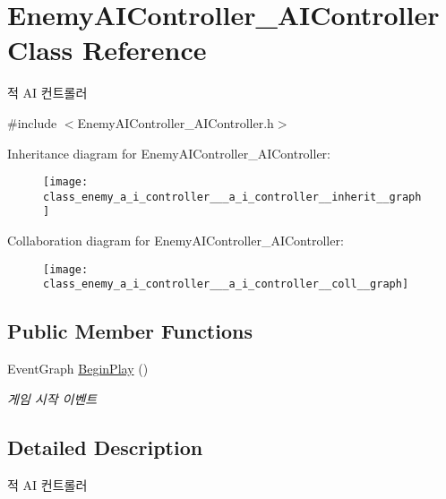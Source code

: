 \hypertarget{class_enemy_a_i_controller___a_i_controller}{}\section{Enemy\+A\+I\+Controller\+\_\+\+A\+I\+Controller Class Reference}
\label{class_enemy_a_i_controller___a_i_controller}


적 AI 컨트롤러  




{\ttfamily \#include $<$Enemy\+A\+I\+Controller\+\_\+\+A\+I\+Controller.\+h$>$}



Inheritance diagram for Enemy\+A\+I\+Controller\+\_\+\+A\+I\+Controller\+:
\nopagebreak
\begin{figure}[H]
\begin{center}
\leavevmode
\texttt{[image: class\_enemy\_a\_i\_controller\_\_\_a\_i\_controller\_\_inherit\_\_graph]}
\end{center}
\end{figure}


Collaboration diagram for Enemy\+A\+I\+Controller\+\_\+\+A\+I\+Controller\+:
\nopagebreak
\begin{figure}[H]
\begin{center}
\leavevmode
\texttt{[image: class\_enemy\_a\_i\_controller\_\_\_a\_i\_controller\_\_coll\_\_graph]}
\end{center}
\end{figure}
\subsection*{Public Member Functions}
\begin{DoxyCompactItemize}
\item 
Event\+Graph \hyperlink{class_enemy_a_i_controller___a_i_controller_ae3c3a76e769cd197ed32402d76d7764c}{Begin\+Play} ()
\begin{DoxyCompactList}\small\item\em 게임 시작 이벤트 \end{DoxyCompactList}\end{DoxyCompactItemize}


\subsection{Detailed Description}
적 AI 컨트롤러 

